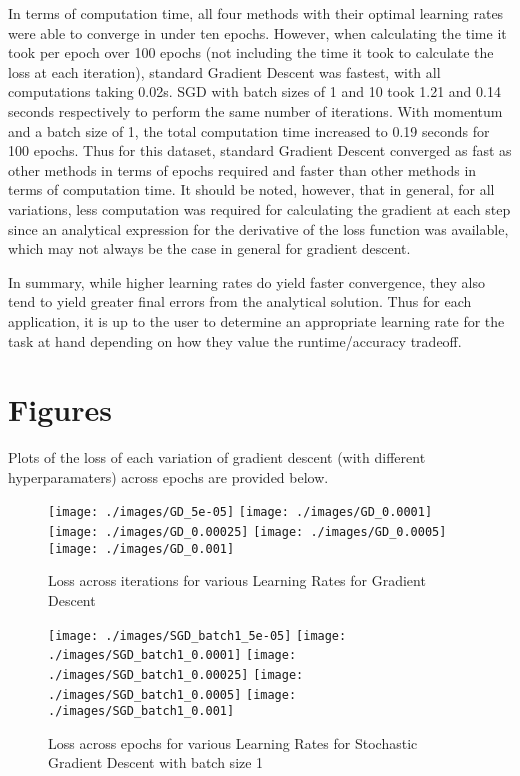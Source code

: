 \documentclass{article}
\begin{document}
In terms of computation time, all four methods with their optimal learning rates were able to converge in under ten epochs. However, when calculating the time it took per epoch over 100 epochs (not including the time it took to calculate the loss at each iteration), standard Gradient Descent was fastest, with all computations taking 0.02s. SGD with batch sizes of 1 and 10 took 1.21 and 0.14 seconds respectively to perform the same number of iterations. With momentum and a batch size of 1, the total computation time increased to 0.19 seconds for 100 epochs. Thus for this dataset, standard Gradient Descent converged as fast as other methods in terms of epochs required and faster than other methods in terms of computation time. It should be noted, however, that in general, for all variations, less computation was required for calculating the gradient at each step since an analytical expression for the derivative of the loss function was available, which may not always be the case in general for gradient descent.

In summary, while higher learning rates do yield faster convergence, they also tend to yield greater final errors from the analytical solution. Thus for each application, it is up to the user to determine an appropriate learning rate for the task at hand depending on how they value the runtime/accuracy tradeoff.

\section{Figures}
Plots of the loss of each variation of gradient descent (with different hyperparamaters) across epochs are provided below.

\begin{figure}
\centering
\texttt{[image: ./images/GD\_5e-05]}
\texttt{[image: ./images/GD\_0.0001]}
\texttt{[image: ./images/GD\_0.00025]}
\texttt{[image: ./images/GD\_0.0005]}
\texttt{[image: ./images/GD\_0.001]}
\caption{Loss across iterations for various Learning Rates for Gradient Descent}
\end{figure}

\begin{figure}
\centering
\texttt{[image: ./images/SGD\_batch1\_5e-05]}
\texttt{[image: ./images/SGD\_batch1\_0.0001]}
\texttt{[image: ./images/SGD\_batch1\_0.00025]}
\texttt{[image: ./images/SGD\_batch1\_0.0005]}
\texttt{[image: ./images/SGD\_batch1\_0.001]}
\caption{Loss across epochs for various Learning Rates for Stochastic Gradient Descent with batch size 1}
\end{figure}
\end{document}
